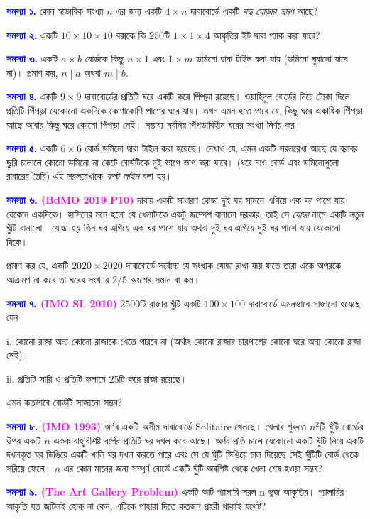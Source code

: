 \documentclass[11pt]{report}
\begin{document}
\begin{flushleft}

\textbf{\textcolor{blue}{সমস্যা ১.}} কোন স্বাভাবিক সংখ্যা $n$ এর জন্য একটি $4 \times n$ দাবাবোর্ডে একটি \textit{বদ্ধ ঘোড়ার ভ্রমণ} আছে?

\textbf{\textcolor{blue}{সমস্যা ২.}} একটি $10 \times 10 \times 10$ বক্সকে কি $250$টি $1 \times 1 \times 4$ আকৃতির ইট দ্বারা প্যাক করা যাবে?

\textbf{\textcolor{blue}{সমস্যা ৩.}} একটি $a \times b$ বোর্ডকে কিছু $n \times 1$ এবং $1 \times m$ ডমিনো দ্বারা টাইল করা যায় (ডমিনো ঘুরানো যাবে না)। প্রমাণ কর, $n \mid a$ অথবা $m \mid b$.

\textbf{\textcolor{blue}{সমস্যা ৪.}} একটি $9 \times 9$ দাবাবোর্ডের প্রতিটি ঘরে একটি করে পিঁপড়া রয়েছে। ওয়াহিদুল বোর্ডের নিচে টোকা দিলে প্রতিটি পিঁপড়া যেকোনো একদিকে কোণাকোণি পাশের ঘরে যায়। তখন এমন হতে পারে যে, কিছু ঘরে একাধিক পিঁপড়া আছে আবার কিছু ঘরে কোনো পিঁপড়া নেই। সম্ভাব্য সর্বনিম্ন পিঁপড়াবিহীন ঘরের সংখ্যা নির্ণয় কর।

\textbf{\textcolor{blue}{সমস্যা ৫.}} একটি $6 \times 6$ বোর্ড ডমিনো দ্বারা টাইল করা হয়েছে। দেখাও যে, এমন একটি সরলরেখা আছে যে বরাবর ছুরি চালালে কোনো ডমিনো না কেটে বোর্ডটিকে দুই ভাগে ভাগ করা যাবে। (ধরে নাও বোর্ড এবং ডমিনোগুলো রাবারের তৈরি) এই সরলরেখাকে \textit{ফল্ট লাইন} বলা হয়।

\textbf{\textcolor{blue}{সমস্যা ৬.} \textcolor{magenta}{(BdMO 2019 P10)}} দাবায় একটি সাধারণ ঘোড়া দুই ঘর সামনে এগিয়ে এক ঘর পাশে যায় যেকোন একদিকে। হাসিনের মনে হলো যে খেলাটাকে একটু জম্পেশ বানানো দরকার, তাই সে \textit{যোদ্ধা} নামে একটি নতুন ঘুঁটি বানালো। যোদ্ধা হয় তিন ঘর এগিয়ে এক ঘর পাশে যায় অথবা দুই ঘর এগিয়ে দুই ঘর পাশে যায় যেকোনো দিকে।

প্রমাণ কর যে, একটি $2020 \times 2020$ দাবাবোর্ডে সর্বোচ্চ যে সংখ্যক যোদ্ধা রাখা যায় যাতে তারা একে অপরকে আক্রমণ না করে তা ঘরের সংখ্যার $2/5$ অংশের সমান বা কম।

\textbf{\textcolor{blue}{সমস্যা ৭.} \textcolor{magenta}{(IMO SL 2010)}} $2500$টি রাজার ঘুঁটি একটি $100 \times 100$ দাবাবোর্ডে এমনভাবে সাজানো হয়েছে যেন

i. কোনো রাজা অন্য কোনো রাজাকে খেতে পারবে না (অর্থাৎ কোনো রাজার চারপাশের কোনো ঘরে অন্য কোনো রাজা নেই)।

ii. প্রতিটি সারি ও প্রতিটি কলামে $25$টি করে রাজা রয়েছে।

এমন কতভাবে বোর্ডটি সাজানো সম্ভব?

\textbf{\textcolor{blue}{সমস্যা ৮.} \textcolor{magenta}{(IMO 1993)}}
অর্ণব একটি অসীম দাবাবোর্ডে Solitaire খেলছে। খেলার শুরুতে $n^2$টি ঘুঁটি বোর্ডের উপর একটি $n$ একক বাহুবিশিষ্ট বর্গের প্রতিটি ঘর দখল করে আছে। অর্ণব প্রতি চালে যেকোনো একটি ঘুঁটি নিয়ে একটি দখলকৃত ঘর ডিঙিয়ে একটি খালি ঘর দখল করতে পারে এবং সে যে ঘুঁটি ডিঙিয়ে চাল দিয়েছে সেই ঘুঁটিটি বোর্ড থেকে সরিয়ে ফেলে। $n$ এর কোন মানের জন্য সম্পূর্ণ বোর্ডে একটি ঘুঁটি অবশিষ্ট থেকে খেলা শেষ হওয়া সম্ভব?

\textbf{\textcolor{blue}{সমস্যা ৯.} \textcolor{magenta}{(The Art Gallery Problem)}} একটি আর্ট গ্যালারি সরল n-ভুজ আকৃতির। গ্যালারির আকৃতি যত জটিলই হোক না কেন, এটিকে পাহারা দিতে কতজন প্রহরী থাকাই যথেষ্ট?

\end{flushleft}
\end{document}
